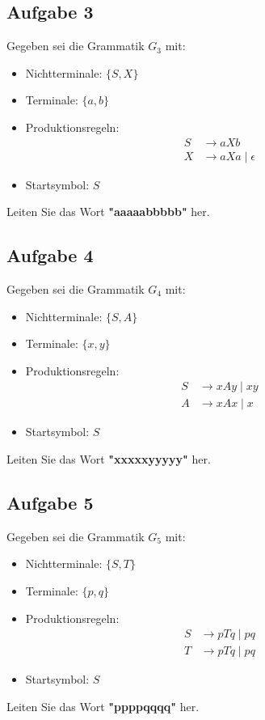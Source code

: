 \documentclass[a4paper,12pt]{article}
\begin{document}
	\subsection*{Aufgabe 3}
	Gegeben sei die Grammatik $G_3$ mit:
	\begin{itemize}
		\item Nichtterminale: $\{S, X\}$
		\item Terminale: $\{a, b\}$
		\item Produktionsregeln:
		\begin{align*}
			S &\rightarrow a X b \\
			X &\rightarrow a X a \mid \epsilon
		\end{align*}
		\item Startsymbol: $S$
	\end{itemize}
	Leiten Sie das Wort \textbf{"aaaaabbbbb"} her.
	
	\subsection*{Aufgabe 4}
	Gegeben sei die Grammatik $G_4$ mit:
	\begin{itemize}
		\item Nichtterminale: $\{S, A\}$
		\item Terminale: $\{x, y\}$
		\item Produktionsregeln:
		\begin{align*}
			S &\rightarrow x A y \mid xy \\
			A &\rightarrow x A x \mid x
		\end{align*}
		\item Startsymbol: $S$
	\end{itemize}
	Leiten Sie das Wort \textbf{"xxxxxyyyyy"} her.
	
	\subsection*{Aufgabe 5}
	Gegeben sei die Grammatik $G_5$ mit:
	\begin{itemize}
		\item Nichtterminale: $\{S, T\}$
		\item Terminale: $\{p, q\}$
		\item Produktionsregeln:
		\begin{align*}
			S &\rightarrow p T q \mid pq \\
			T &\rightarrow p T q \mid p q
		\end{align*}
		\item Startsymbol: $S$
	\end{itemize}
	Leiten Sie das Wort \textbf{"ppppqqqq"} her.
	
\end{document}
